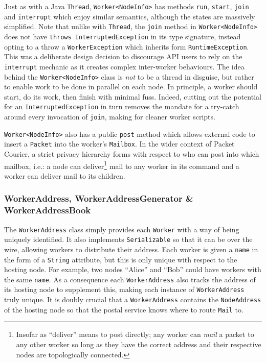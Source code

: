 Just as with a Java \texttt{Thread}\cite{java_Thread}, \texttt{Worker<NodeInfo>} has methods \texttt{run},
\texttt{start}, \texttt{join} and \texttt{interrupt} which enjoy similar semantics, although the states are massively
simplified. Note that unlike with \texttt{Thread}, the \texttt{join} method in \texttt{Worker<NodeInfo>} does not
have \texttt{throws InterruptedException} in its type signature, instead opting to a throw a \texttt{WorkerException}
which inherits form \texttt{RuntimeException}\cite{java_RuntimeException}. This was a deliberate design decision to
discourage API users to rely on the \texttt{interrupt} mechanic as it creates complex inter-worker behaviours. The
idea behind the \texttt{Worker<NodeInfo>} class is \emph{not} to be a thread in disguise, but rather to enable work
to be done in parallel on each node. In principle, a worker should start, do its work, then finish with minimal fuss.
Indeed, cutting out the potential for an \texttt{InterruptedException} in turn removes the mandate for a try-catch
around every invocation of \texttt{join}, making for cleaner worker scripts.

\texttt{Worker<NodeInfo>} also has a public \texttt{post} method which allows external code to insert a
\texttt{Packet} into the worker's \texttt{Mailbox}. In the wider context of Packet Courier, a strict privacy
hierarchy forms with respect to who can post into which mailbox, i.e.: a node can deliver\footnote{Insofar as
``deliver'' means to post directly; any worker can \emph{mail} a packet to any other worker so long as they have the
correct address and their respective nodes are topologically connected.} mail to any worker in its command and a
worker can deliver mail to its children.

\subsubsection{WorkerAddress, WorkerAddressGenerator \&
WorkerAddressBook}\label{subsubsection:worker_address_worker_address_generator_and_worker_address_book}

The \texttt{WorkerAddress} class simply provides each \texttt{Worker} with a way of being uniquely identified. It
also implements \texttt{Serializable}\cite{java_Serializable} so that it can be over the wire, allowing workers to
distribute their address. Each worker is given a \texttt{name} in the form of a \texttt{String}
attribute, but this is only unique with respect to the hosting node. For example, two nodes ``Alice'' and ``Bob''
could have workers with the same \texttt{name}. As a consequence each \texttt{WorkerAddress} also tracks the address
of its hosting node to supplement this, making each instance of \texttt{WorkerAddress} truly unique. It is doubly
crucial that a \texttt{WorkerAddress} contains the \texttt{NodeAddress} of the hosting node so that the postal
service knows where to route \texttt{Mail} to.


